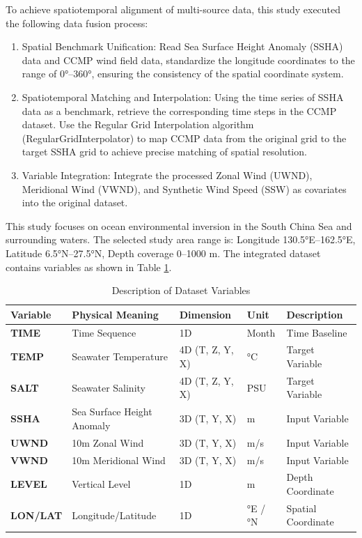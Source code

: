 \documentclass[webpdf,contemporary,large]{oup-authoring-template}
\begin{document}
To achieve spatiotemporal alignment of multi-source data, this study executed the following data fusion process:

\begin{enumerate}
\renewcommand{\labelenumi}{\alph{enumi})}
\item Spatial Benchmark Unification: Read Sea Surface Height Anomaly (SSHA) data and CCMP wind field data, standardize the longitude coordinates to the range of 0°–360°, ensuring the consistency of the spatial coordinate system.

\item Spatiotemporal Matching and Interpolation: Using the time series of SSHA data as a benchmark, retrieve the corresponding time steps in the CCMP dataset. Use the Regular Grid Interpolation algorithm (RegularGridInterpolator) to map CCMP data from the original grid to the target SSHA grid to achieve precise matching of spatial resolution.

\item Variable Integration: Integrate the processed Zonal Wind (UWND), Meridional Wind (VWND), and Synthetic Wind Speed (SSW) as covariates into the original dataset.
\end{enumerate}

This study focuses on ocean environmental inversion in the South China Sea and surrounding waters. The selected study area range is: Longitude 130.5°E–162.5°E, Latitude 6.5°N–27.5°N, Depth coverage 0–1000 m. The integrated dataset contains variables as shown in Table \ref{tab:dataset_vars}.

\begin{table}[t]
\caption{Description of Dataset Variables}
\label{tab:dataset_vars}
\centering
\begin{tabular}{lllll}
\toprule
\textbf{Variable} & \textbf{Physical Meaning} & \textbf{Dimension} & \textbf{Unit} & \textbf{Description} \\
\midrule
\textbf{TIME} & Time Sequence & 1D & Month & Time Baseline \\
\textbf{TEMP} & Seawater Temperature & 4D (T, Z, Y, X) & °C & Target Variable \\
\textbf{SALT} & Seawater Salinity & 4D (T, Z, Y, X) & PSU & Target Variable \\
\textbf{SSHA} & Sea Surface Height Anomaly & 3D (T, Y, X) & m & Input Variable \\
\textbf{UWND} & 10m Zonal Wind & 3D (T, Y, X) & m/s & Input Variable \\
\textbf{VWND} & 10m Meridional Wind & 3D (T, Y, X) & m/s & Input Variable \\
\textbf{LEVEL} & Vertical Level & 1D & m & Depth Coordinate \\
\textbf{LON/LAT} & Longitude/Latitude & 1D & °E / °N & Spatial Coordinate \\
\bottomrule
\end{tabular}
\end{table}
\end{document}
